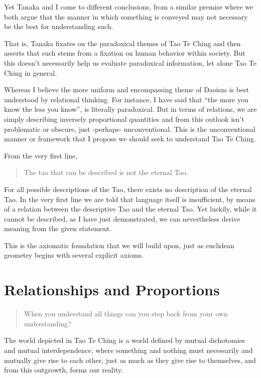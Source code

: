 Yet Tanaka and I come to different conclusions, from a similar premise where we both argue that the manner in which something is conveyed may not necessary be the best for understanding such.

That is, Tanaka fixates on the paradoxical themes of Tao Te Ching and then asserts that such stems from a fixation on human behavior within society. But this doesn’t necessarily help us evaluate paradoxical information, let alone Tao Te Ching in general. 

Whereas I believe the more uniform and encompassing theme of Daoism is best understood by relational thinking. For instance, I have said that “the more you know the less you know”, is literally paradoxical. But in terms of relations, we are simply describing inversely proportional quantities and from this outlook isn’t problematic or obscure, just -perhaps- unconventional. This is the unconventional manner or framework that I propose we should seek to understand Tao Te Ching.

From the very first line,
\begin{verse}
The tao that can be described is not the eternal Tao.\\
\end{verse}

For all possible descriptions of the Tao, there exists no description of the eternal Tao. In the very first line we are told that language itself is insufficient, by means of a relation between the descriptive Tao and the eternal Tao. Yet luckily, while it cannot be described, as I have just demonstrated, we can nevertheless derive meaning from the given statement.

This is the axiomatic foundation that we will build upon, just as euclidean geometry begins with several explicit axioms.

\section{Relationships and Proportions}
\begin{verse}
When you understand all things can you step back from your own understanding?\\
\end{verse}

\noindent
The world depicted in Tao Te Ching is a world defined by mutual dichotomies and mutual interdependence, where something and nothing must necessarily and mutually give rise to each other, just as much as they give rise to themselves, and from this outgrowth, forms our reality.

